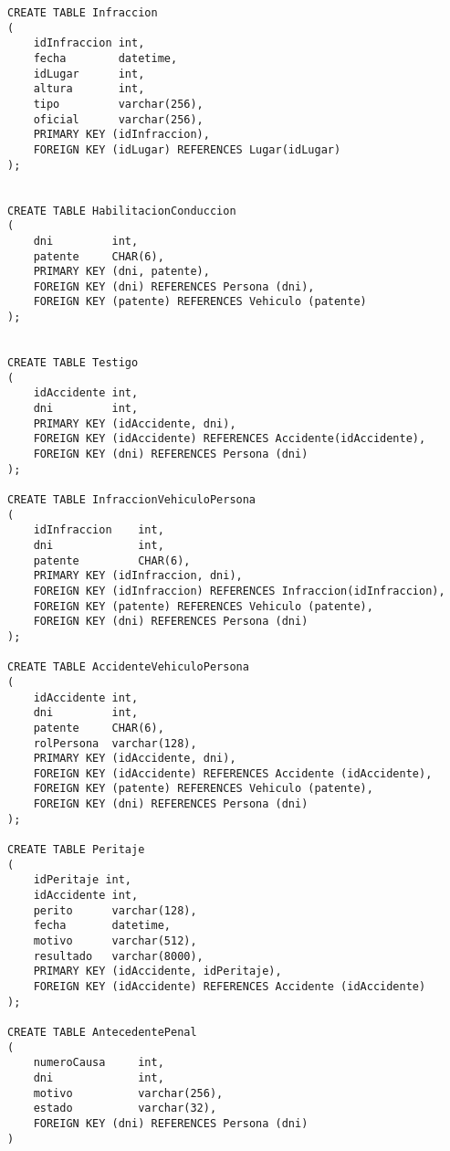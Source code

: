 {\begin{verbatim}
CREATE TABLE Infraccion
(
    idInfraccion int,
    fecha	 	 datetime,
    idLugar		 int,
	altura		 int,
    tipo	     varchar(256),
	oficial		 varchar(256),
	PRIMARY KEY (idInfraccion), 
	FOREIGN KEY (idLugar) REFERENCES Lugar(idLugar)
);


CREATE TABLE HabilitacionConduccion
(
    dni			int,
    patente		CHAR(6), 
	PRIMARY KEY (dni, patente),
    FOREIGN KEY (dni) REFERENCES Persona (dni), 
	FOREIGN KEY (patente) REFERENCES Vehiculo (patente)
);


CREATE TABLE Testigo
(
    idAccidente int,
    dni 		int,
    PRIMARY KEY (idAccidente, dni),
    FOREIGN KEY (idAccidente) REFERENCES Accidente(idAccidente),
    FOREIGN KEY (dni) REFERENCES Persona (dni)
);

CREATE TABLE InfraccionVehiculoPersona
(
    idInfraccion    int,
    dni             int,
    patente         CHAR(6),
    PRIMARY KEY (idInfraccion, dni),
    FOREIGN KEY (idInfraccion) REFERENCES Infraccion(idInfraccion),
    FOREIGN KEY (patente) REFERENCES Vehiculo (patente),
    FOREIGN KEY (dni) REFERENCES Persona (dni)
);

CREATE TABLE AccidenteVehiculoPersona
(
    idAccidente int,
    dni			int,
    patente 	CHAR(6),
	rolPersona	varchar(128),
    PRIMARY KEY (idAccidente, dni),
    FOREIGN KEY (idAccidente) REFERENCES Accidente (idAccidente),
    FOREIGN KEY (patente) REFERENCES Vehiculo (patente),
    FOREIGN KEY (dni) REFERENCES Persona (dni)
);

CREATE TABLE Peritaje
(
    idPeritaje int, 
    idAccidente int,
	perito		varchar(128), 
	fecha		datetime, 
	motivo		varchar(512), 
	resultado	varchar(8000),
    PRIMARY KEY (idAccidente, idPeritaje),
    FOREIGN KEY (idAccidente) REFERENCES Accidente (idAccidente)
);

CREATE TABLE AntecedentePenal 
(
    numeroCausa     int,
    dni             int,
    motivo          varchar(256),
    estado          varchar(32),
    FOREIGN KEY (dni) REFERENCES Persona (dni)
)


\end{verbatim}}
